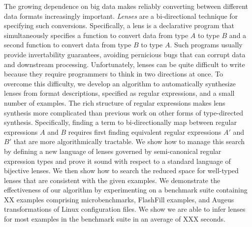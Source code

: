 The growing dependence on big data makes reliably converting
between different data formats increasingly important.
\emph{Lenses} are a bi-directional technique for specifying such
conversions.  Specifically, a lens is a declarative program that
simultaneously specifies a function to convert data from type $A$ to
type $B$ and a second function to convert data from type $B$ to type
$A$.  Such programs usually provide invertability guarantees, avoiding
pernicious bugs that can corrupt data and downstream processing.
Unfortunately, lenses can be quite difficult to write because they
require programmers to think in two directions at once.  To overcome
this difficulty, we develop an algorithm to automatically synthesize
lenses from format descriptions, specified as regular expressions, and
a small number of examples.  The rich structure of regular expressions
makes lens synthesis more complicated than previous work on other
forms of type-directed synthesis.  Specifically, finding a term to
bi-directionally map between regular expressions $A$ and $B$ requires
first finding equivalent regular expressions $A'$ and $B'$ that are
more algorithmically tractable.
We show how to manage this search by defining a new language of
lenses governed by semi-canonical regular expression types and prove it
sound with respect to a standard language of bijective lenses.  
We then show
how to search the reduced space for well-typed lenses that are consistent
with the given examples.  We demonstrate the effectiveness of our algorithm
by experimenting on a benchmark suite containing XX examples
comprising microbenchmarks, FlashFill
examples, and Augeus transformations of Linux configuration files.
We show we are able to infer lenses for most examples in the
benchmark suite in an average of XXX seconds. 



